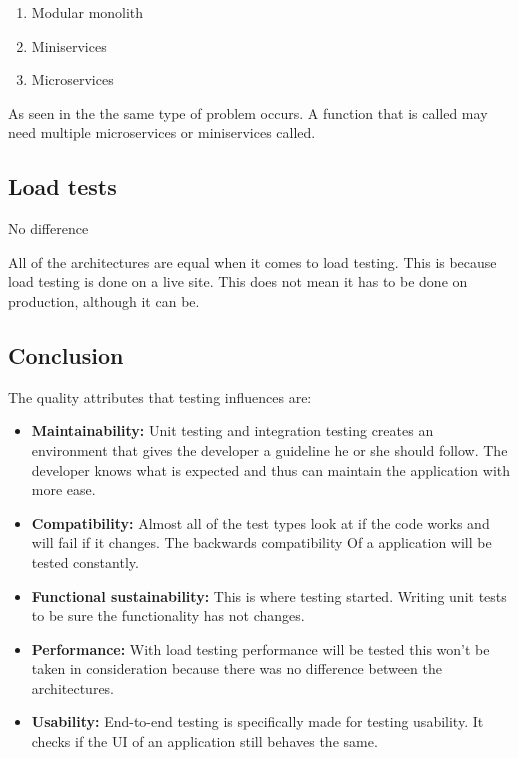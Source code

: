 \begin{enumerate}
        \item Modular monolith
        \item Miniservices
        \item Microservices
\end{enumerate}

As seen in the  the same type of problem occurs. A function that is called may need multiple microservices or miniservices called.

\subsection{Load tests}

No difference

All of the architectures are equal when it comes to load testing. This is because load testing is done on a live site. This does not mean it has to be done on production, although it can be.

\subsection{Conclusion}

The quality attributes that testing influences are:

\begin{itemize}
        \item \textbf{Maintainability:} Unit testing and integration testing creates an environment that gives the developer a guideline he or she should follow. The developer knows what is expected and thus can maintain the application with more ease.

        \item \textbf{Compatibility:} Almost all of the test types look at if the code works and will fail if it changes. The backwards compatibility Of a application will be tested constantly.

        \item \textbf{Functional sustainability:} This is where testing started. Writing unit tests to be sure the functionality has not changes.

        \item \textbf{Performance:} With load testing performance will be tested this won’t be taken in consideration because there was no difference between the architectures.

        \item \textbf{Usability:} End-to-end testing is specifically made for testing usability. It checks if the UI of an application still behaves the same.
\end{itemize}


